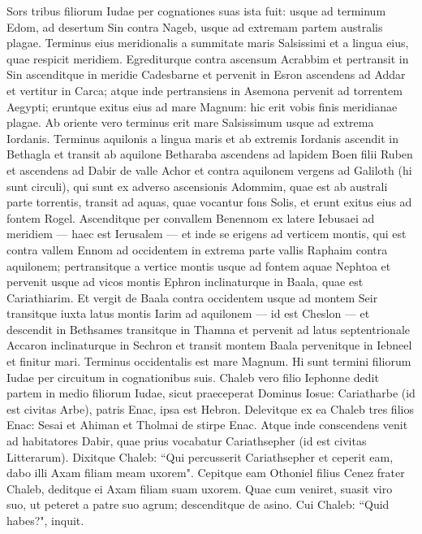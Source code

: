 \begin{biblechapter}  
\verse Sors tribus filiorum Iudae per cognationes suas ista fuit: usque ad terminum Edom, ad desertum Sin contra Nageb, usque ad extremam partem australis plagae. 
\verse Terminus eius meridionalis a summitate maris Salsissimi et a lingua eius, quae respicit meridiem. 
\verse Egrediturque contra ascensum Acrabbim et pertransit in Sin ascenditque in meridie Cadesbarne et pervenit in Esron ascendens ad Addar et vertitur in Carca; 
\verse atque inde pertransiens in Asemona pervenit ad torrentem Aegypti; eruntque exitus eius ad mare Magnum: hic erit vobis finis meridianae plagae. 
\verse Ab oriente vero terminus erit mare Salsissimum usque ad extrema Iordanis. Terminus aquilonis a lingua maris et ab extremis Iordanis 
\verse ascendit in Bethagla et transit ab aquilone Betharaba ascendens ad lapidem Boen filii Ruben 
\verse et ascendens ad Dabir de valle Achor et contra aquilonem vergens ad Galiloth (hi sunt circuli), qui sunt ex adverso ascensionis Adommim, quae est ab australi parte torrentis, transit ad aquas, quae vocantur fons Solis, et erunt exitus eius ad fontem Rogel. 
\verse Ascenditque per convallem Benennom ex latere Iebusaei ad meridiem — haec est Ierusalem — et inde se erigens ad verticem montis, qui est contra vallem Ennom ad occidentem in extrema parte vallis Raphaim contra aquilonem; 
\verse pertransitque a vertice montis usque ad fontem aquae Nephtoa et pervenit usque ad vicos montis Ephron inclinaturque in Baala, quae est Cariathiarim. 
\verse Et vergit de Baala contra occidentem usque ad montem Seir transitque iuxta latus montis Iarim ad aquilonem — id est Cheslon — et descendit in Bethsames transitque in Thamna 
\verse et pervenit ad latus septentrionale Accaron inclinaturque in Sechron et transit montem Baala pervenitque in Iebneel et finitur mari. Terminus occidentalis est mare Magnum. 
\verse Hi sunt termini filiorum Iudae per circuitum in cognationibus suis. 
\verse Chaleb vero filio Iephonne dedit partem in medio filiorum Iudae, sicut praeceperat Dominus Iosue: Cariatharbe (id est civitas Arbe), patris Enac, ipsa est Hebron. 
\verse Delevitque ex ea Chaleb tres filios Enac: Sesai et Ahiman et Tholmai de stirpe Enac. 
\verse Atque inde conscendens venit ad habitatores Dabir, quae prius vocabatur Cariathsepher (id est civitas Litterarum). 
\verse Dixitque Chaleb: “Qui percusserit Cariathsepher et ceperit eam, dabo illi Axam filiam meam uxorem". 
\verse Cepitque eam Othoniel filius Cenez frater Chaleb, deditque ei Axam filiam suam uxorem. 
\verse Quae cum veniret, suasit viro suo, ut peteret a patre suo agrum; descenditque de asino. Cui Chaleb: “Quid habes?", inquit. 

\end{biblechapter}

